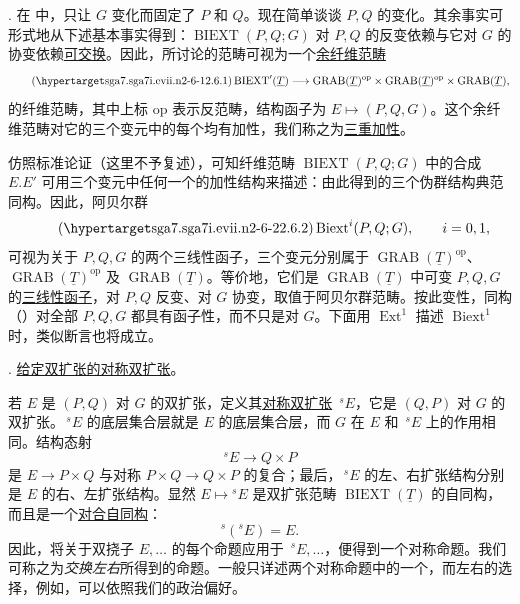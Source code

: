 

. 在  中，只让 $G$ 变化而固定了 $P$ 和 $Q$。现在简单谈谈 $P,Q$ 的变化。其余事实可形式地从下述基本事实得到：$\operatorname{BIEXT}(P,Q;G)$ 对 $P,Q$ 的反变依赖与它对 $G$ 的协变依赖\underline{可交换}。因此，所讨论的范畴可视为一个\underline{余纤维范畴}
\begin{equation}\tag{\SGARefTarget{sga7.sga7i.evii.n2-6-1}{2.6.1}}
 \operatorname{BIEXT}'(\underline T)
 \longrightarrow
 \operatorname{GRAB}(\underline T)^{\mathrm{op}}\times
 \operatorname{GRAB}(\underline T)^{\mathrm{op}}\times
 \operatorname{GRAB}(\underline T),
\end{equation}
的纤维范畴，其中上标 $\mathrm{op}$ 表示反范畴，结构函子为 $E\mapsto(P,Q,G)$。这个余纤维范畴对它的三个变元中的每个均有加性，我们称之为\underline{三重加性}。

仿照标准论证（这里不予复述），可知纤维范畴 $\operatorname{BIEXT}(P,Q;G)$ 中的合成 $E.E'$ 可用三个变元中任何一个的加性结构来描述：由此得到的三个伪群结构典范同构。因此，阿贝尔群
\begin{equation}\tag{\SGARefTarget{sga7.sga7i.evii.n2-6-2}{2.6.2}}
 \operatorname{Biext}^{i}(P,Q;G),\qquad i=0,1,
\end{equation}
可视为关于 $P,Q,G$ 的两个三线性函子，三个变元分别属于 $\operatorname{GRAB}(\underline T)^{\mathrm{op}}$、$\operatorname{GRAB}(\underline T)^{\mathrm{op}}$ 及 $\operatorname{GRAB}(\underline T)$。等价地，它们是 $\operatorname{GRAB}(\underline T)$ 中可变 $P,Q,G$ 的\underline{三线性函子}，对 $P,Q$ 反变、对 $G$ 协变，取值于阿贝尔群范畴。按此变性，同构（）对全部 $P,Q,G$ 都具有函子性，而不只是对 $G$。下面用 $\operatorname{Ext}^{1}$ 描述 $\operatorname{Biext}^{1}$ 时，类似断言也将成立。

. \underline{给定双扩张的对称双扩张}。

若 $E$ 是 $(P,Q)$ 对 $G$ 的双扩张，定义其\underline{对称双扩张} $\,{}^{s}E$，它是 $(Q,P)$ 对 $G$ 的双扩张。$\,{}^{s}E$ 的底层集合层就是 $E$ 的底层集合层，而 $G$ 在 $E$ 和 $\,{}^{s}E$ 上的作用相同。结构态射
\[
 {}^{s}E\longrightarrow Q\times P
\]
是 $E\longrightarrow P\times Q$ 与对称 $P\times Q\longrightarrow Q\times P$ 的复合；最后，$\,{}^{s}E$ 的左、右扩张结构分别是 $E$ 的右、左扩张结构。显然 $E\mapsto{}^{s}E$ 是双扩张范畴 $\operatorname{BIEXT}(\underline T)$ 的自同构，而且是一个\underline{对合自同构}：
\[
 {}^{s}({}^{s}E)=E.
\]
因此，将关于双挠子 $E,\ldots$ 的每个命题应用于 $\,{}^{s}E,\ldots$，便得到一个对称命题。我们可称之为\emph{交换左右}所得到的命题。一般只详述两个对称命题中的一个，而左右的选择，例如，可以依照我们的政治偏好。


